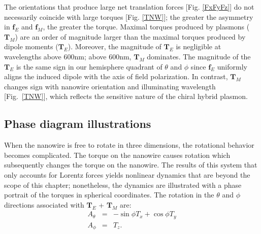 The orientations that produce large net translation forces [Fig. \ref{FxFyFz}] do not necessarily coincide with large torques [Fig. \ref{TNW}]; the greater the asymmetry in $\mathbf{f}_E$ and $\mathbf{f}_M$, the greater the torque. Maximal torques produced by plasmons ($\mathbf{T}_M$) are an order of magnitude larger than the maximal torques produced by dipole moments ($\mathbf{T}_E$). Moreover, the magnitude of $\mathbf{T}_E$ is negligible at wavelengths above 600nm; above 600nm, $\mathbf{T}_M$ dominates. The magnitude of the $\mathbf{T}_E$ is the same sign in our hemisphere quadrant of $\theta$ and $\phi$ since $\mathbf{f}_E$ uniformly aligns the induced dipole with the axis of field polarization. In contrast, $\mathbf{T}_M$ changes sign with nanowire orientation and illuminating wavelength [Fig.~\ref{TNW}], which reflects the sensitive nature of the chiral hybrid plasmon.

\subsection{Phase diagram illustrations}
When the nanowire is free to rotate in three dimensions, the rotational behavior becomes complicated. The torque on the nanowire causes rotation which subsequently changes the torque on the nanowire. The results of this system that only accounts for Lorentz forces yields nonlinear dynamics that are beyond the scope of this chapter; nonetheless, the dynamics are illustrated with a phase portrait of the torques in spherical coordinates. The rotation in the $\theta$ and $\phi$ directions associated with $\mathbf{T}_E$  + $\mathbf{T}_M$ are:
\begin{eqnarray}
A_{\theta} &=& -\sin\phi T_x + \cos\phi T_y \label{Atheta}
\\A_\phi &=& T_z. \label{Aphi}
\end{eqnarray}

